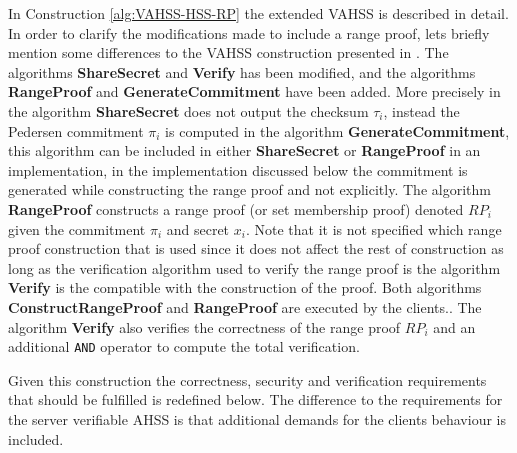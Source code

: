 In Construction \ref{alg:VAHSS-HSS-RP} the extended VAHSS is described in detail. In order to clarify the modifications made to include a range proof, lets briefly mention some differences to the VAHSS construction presented in \cite{SumItUp}.  The algorithms \textbf{ShareSecret} and \textbf{Verify} has been modified,  and the algorithms \textbf{RangeProof} and \textbf{GenerateCommitment} have been added. More precisely in the algorithm \textbf{ShareSecret} does not output the checksum $\tau_i$, instead the Pedersen commitment $\pi_i$ is computed in the algorithm \textbf{GenerateCommitment}, this algorithm can be included in either \textbf{ShareSecret}  or \textbf{RangeProof} in an implementation, in the implementation discussed below the commitment is generated while constructing the range proof and not explicitly. The algorithm \textbf{RangeProof} constructs a range proof (or set membership proof) denoted $RP_i$ given the commitment $\pi_i$ and secret $x_i$. Note that it is not specified which range proof construction that is used since it does not affect the rest of construction as long as the verification algorithm used to verify the range proof is the algorithm \textbf{Verify} is the compatible with the construction of the proof. Both algorithms \textbf{ConstructRangeProof} and \textbf{RangeProof} are executed by the clients.. The algorithm \textbf{Verify} also verifies the correctness of the range proof $RP_i$ and an additional \texttt{AND} operator to compute the total verification. 


Given this construction the correctness, security and verification requirements that should be fulfilled is redefined below.  The difference to the requirements for the server verifiable AHSS is that additional demands for the clients behaviour is included. 

